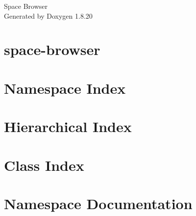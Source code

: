 \let\mypdfximage\pdfximage\def\pdfximage{\immediate\mypdfximage}\documentclass[twoside]{book}
\newcommand{\+}{\discretionary{\mbox{\scriptsize$\hookleftarrow$}}{}{}}
\newcommand{\clearemptydoublepage}{%
  \newpage{\pagestyle{empty}\cleardoublepage}%
}
\begin{document}
\hypersetup{pageanchor=false,
             bookmarksnumbered=true,
             pdfencoding=unicode
            }
\begin{titlepage}
\vspace*{7cm}
\begin{center}%
{\Large Space Browser }\\
\vspace*{1cm}
{\large Generated by Doxygen 1.8.20}\\
\end{center}
\end{titlepage}
\clearemptydoublepage
{}
\tableofcontents
\clearemptydoublepage
{}
\hypersetup{pageanchor=true}

\chapter{space-\/browser}
\label{md__r_e_a_d_m_e}

\chapter{Namespace Index}

\chapter{Hierarchical Index}

\chapter{Class Index}

\chapter{Namespace Documentation}










\end{document}
